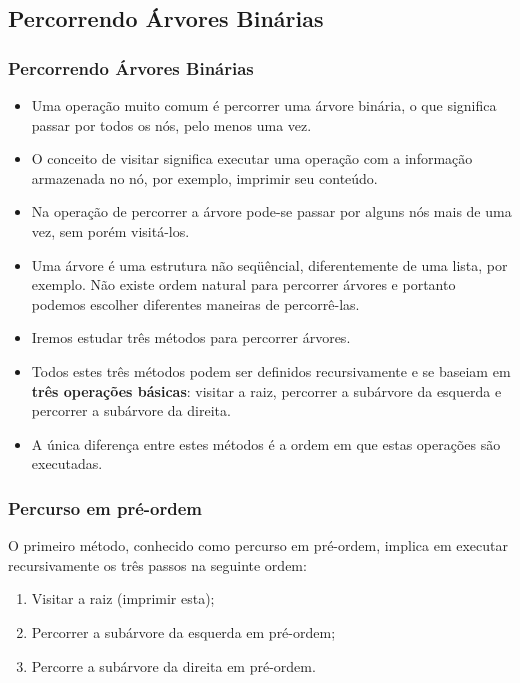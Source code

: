 \subsection{Percorrendo Árvores Binárias}
\begin{frame}
  \frametitle{Percorrendo Árvores Binárias}

\begin{itemize}
  \item Uma operação muito comum é percorrer uma árvore binária, o que significa passar por todos os nós, pelo menos uma vez.

 \item  O conceito de visitar significa executar uma operação com a informação armazenada no nó, por exemplo, imprimir seu conteúdo. 

 \item Na operação de percorrer a árvore pode-se passar por alguns nós mais de uma vez, sem porém visitá-los.

 \item Uma árvore é uma estrutura não seqüêncial, diferentemente de uma lista, por exemplo. Não existe ordem natural para percorrer árvores e portanto podemos escolher diferentes maneiras de percorrê-las. 

 \item  Iremos estudar três métodos para percorrer árvores. 

 \item Todos estes três métodos podem ser definidos recursivamente e se baseiam em \textbf{três operações básicas}: visitar a raiz, percorrer a subárvore da esquerda e percorrer a subárvore da direita. 

 \item A única diferença entre estes métodos é a ordem em que estas operações são executadas.
\end{itemize}

\end{frame}

\begin{frame}
  
  \frametitle{Percurso em pré-ordem}
  
O primeiro método, conhecido como percurso em pré-ordem, implica em executar 
recursivamente os três passos na seguinte ordem: 
 
\begin{enumerate}
  \item Visitar a raiz (imprimir esta);
 \item Percorrer a subárvore da esquerda em pré-ordem;
 \item Percorre a subárvore da direita em pré-ordem.

\end{enumerate}

\end{frame}


